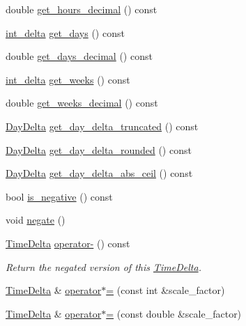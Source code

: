 \begin{DoxyCompactItemize}
\item 
double \hyperlink{structTimeDelta_af64fa27b7580167e18cd30ab1bec06ac}{get\-\_\-hours\-\_\-decimal} () const 
\item 
\hyperlink{types_8h_a10729255b1946fd4fb654b2fe814910b}{int\-\_\-delta} \hyperlink{structTimeDelta_a0ce6b1715ab92fa1e66e14e952a64268}{get\-\_\-days} () const 
\item 
double \hyperlink{structTimeDelta_a76f968368aff4b45c80b0b147c417fd3}{get\-\_\-days\-\_\-decimal} () const 
\item 
\hyperlink{types_8h_a10729255b1946fd4fb654b2fe814910b}{int\-\_\-delta} \hyperlink{structTimeDelta_aab4f773272785b9421b101ee243c0eaf}{get\-\_\-weeks} () const 
\item 
double \hyperlink{structTimeDelta_a927aad8d85f646d3712ded9c09ae957a}{get\-\_\-weeks\-\_\-decimal} () const 
\item 
\hyperlink{structDayDelta}{\-Day\-Delta} \hyperlink{structTimeDelta_a159836075fddd7cef439a08b206f0e97}{get\-\_\-day\-\_\-delta\-\_\-truncated} () const 
\item 
\hyperlink{structDayDelta}{\-Day\-Delta} \hyperlink{structTimeDelta_a188dd345b8e7eeceff4320103c727d15}{get\-\_\-day\-\_\-delta\-\_\-rounded} () const 
\item 
\hyperlink{structDayDelta}{\-Day\-Delta} \hyperlink{structTimeDelta_a50d3fe29ff74cd653c6b063c0ba05528}{get\-\_\-day\-\_\-delta\-\_\-abs\-\_\-ceil} () const 
\item 
bool \hyperlink{structTimeDelta_acc2faf0e9a1563c84fb68cad42521c54}{is\-\_\-negative} () const 
\item 
void \hyperlink{structTimeDelta_a858c8d0eae6070a24ba7fd3e18a3cf3f}{negate} ()
\item 
\hyperlink{structTimeDelta}{\-Time\-Delta} \hyperlink{structTimeDelta_a660df6f5ba7291bef24d5a05639563b6}{operator-\/} () const 
\begin{DoxyCompactList}\small\item\em \-Return the negated version of this \hyperlink{structTimeDelta}{\-Time\-Delta}. \end{DoxyCompactList}\item 
\hyperlink{structTimeDelta}{\-Time\-Delta} \& \hyperlink{structTimeDelta_aa1417029a51a1e2e7cf20445ad6cfa01}{operator$\ast$=} (const int \&scale\-\_\-factor)
\item 
\hyperlink{structTimeDelta}{\-Time\-Delta} \& \hyperlink{structTimeDelta_a8301b98264ca9539a160a756e4014559}{operator$\ast$=} (const double \&scale\-\_\-factor)
\item 

\end{DoxyCompactItemize}
